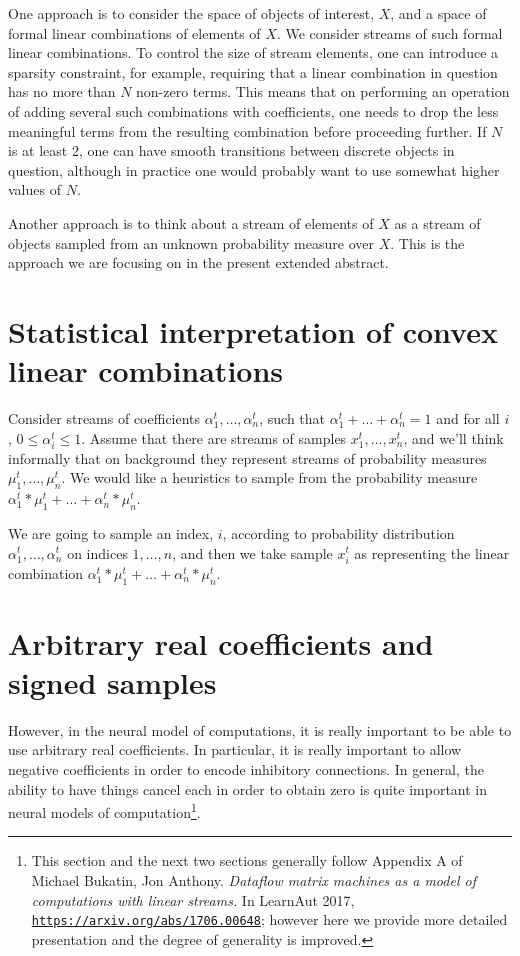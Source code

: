 \documentclass{article}
\begin{document}
One approach is to consider the space of objects of interest, $X$, and a space of formal linear combinations
of elements of $X$. We consider streams of such formal linear combinations. To control the size of stream elements,
one can introduce a sparsity constraint, for example, requiring that a linear combination in question has no more
than $N$ non-zero terms. This means that on performing an operation of adding several such combinations with
coefficients, one needs to drop the less meaningful terms from the resulting combination before proceeding further.
If $N$ is at least 2, one can have smooth transitions between discrete objects in question, although in practice one would
probably want to use somewhat higher values of $N$.

Another approach is to think about a stream of elements of $X$ as a stream of objects sampled from an unknown
probability measure over $X$. This is the approach we are focusing on in the present extended abstract.

\section{Statistical interpretation of convex linear combinations}

Consider streams of coefficients $\alpha_1^t, \dots, \alpha_n^t$, such that $\alpha_1^t + \dots + \alpha_n^t = 1$ and for all $i$,
$0 \leq \alpha_i^t \leq 1$. Assume that there are streams of samples $x_1^t, \dots, x_n^t$, and we'll think informally that on background
they represent streams of probability measures $\mu_1^t, \dots, \mu_n^t$. 
We would like a heuristics to sample from the probability measure $\alpha_1^t * \mu_1^t + \dots +  \alpha_n^t * \mu_n^t$.

We are going to sample an index, $i$, according to probability distribution $\alpha_1^t, \dots, \alpha_n^t$ on indices
$1, \dots, n$, and then we take sample $x_i^t$ as representing the linear combination $\alpha_1^t * \mu_1^t + \dots +  \alpha_n^t * \mu_n^t$.


\section{Arbitrary real coefficients and signed samples}\label{sec:negative}

However, in the neural model of computations, it is really important to be able to use arbitrary real coefficients.
In particular, it is really important to allow negative coefficients in order to encode inhibitory connections.
In general, the ability to have things cancel each in order to obtain zero is quite important in neural models
of computation\footnote{This section and the next two sections generally follow Appendix A of
Michael Bukatin, Jon Anthony.
{\em Dataflow matrix machines as a model of computations with linear streams.} In LearnAut 2017,
\href{https://arxiv.org/abs/1706.00648}{\tt https://arxiv.org/abs/1706.00648}; however here we provide more detailed presentation and the degree of generality is improved.}.
\end{document}
